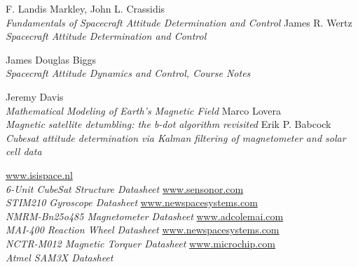 \documentclass[11pt,a4paper]{report}
\begin{document}



\tableofcontents{}

\clearpage{}

\setcounter{page}{3}

\glsaddall
\glsdisablehyper
\printnoidxglossary[type=\acronymtype,title=Abbreviated Terms]

\nocite{*}
\renewcommand\bibname{Reference Books}
\begin{thebibliography}{0}
    F. Landis Markley, John L. Crassidis \\
    \textit{Fundamentals of Spacecraft Attitude Determination and Control} 
    James R. Wertz \\
    \textit{Spacecraft Attitude Determination and Control}
\end{thebibliography}

\renewcommand\bibname{Reference Notes}
\begin{thebibliography}{0}
\setcounter{enumiv}{2}
    James Douglas Biggs \\
    \textit{Spacecraft Attitude Dynamics and Control, Course Notes}  
\end{thebibliography}

\renewcommand\bibname{Reference Articles}
\begin{thebibliography}{0}
\setcounter{enumiv}{3}
    Jeremy Davis\\
    \textit{Mathematical Modeling of Earth’s Magnetic Field}
    Marco Lovera\\    
    \textit{Magnetic satellite detumbling: the b-dot algorithm revisited}
    Erik P. Babcock\\    
    \textit{Cubesat attitude determination via Kalman filtering of magnetometer and solar cell data}
\end{thebibliography}

\renewcommand\bibname{Datasheets \& User Manuals}
\renewcommand\UrlFont{\rmfamily}
\begin{thebibliography}{0}
\setcounter{enumiv}{6}
    \url{www.isispace.nl}\\
    \textit{6-Unit CubeSat Structure Datasheet} 
    \url{www.sensonor.com}\\
    \textit{STIM210 Gyroscope Datasheet} 
    \url{www.newspacesystems.com}\\
    \textit{NMRM-Bn25o485 Magnetometer Datasheet}
    \url{www.adcolemai.com}\\
    \textit{MAI-400 Reaction Wheel Datasheet}      
    \url{www.newspacesystems.com}\\
    \textit{NCTR-M012 Magnetic Torquer Datasheet}    
    \url{www.microchip.com}\\
    \textit{Atmel SAM3X Datasheet}       
\end{thebibliography}
\end{document}

